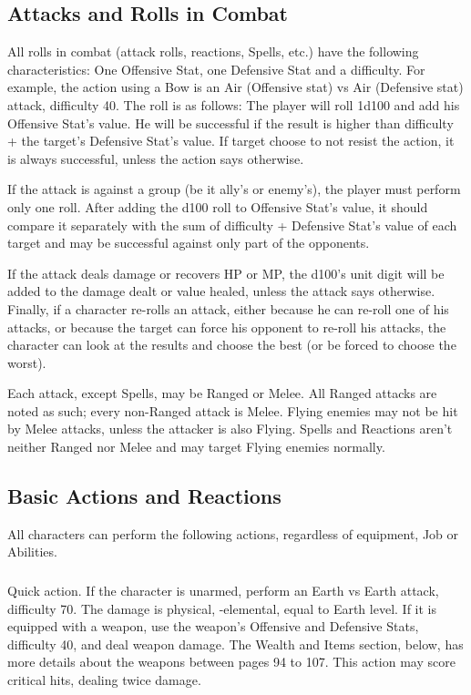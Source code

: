 \begin{multicols}{2}
\subsection{Attacks and Rolls in Combat}\label{subsec:attacks}
All rolls in combat (attack rolls, reactions, Spells, etc.) have the following characteristics: One Offensive Stat, one Defensive Stat and a difficulty. For example, the  action using a Bow is an Air (Offensive stat) vs Air (Defensive stat) attack, difficulty 40. The roll is as follows: The player will roll 1d100 and add his Offensive Stat’s value. He will be successful if the result is higher than difficulty + the target’s Defensive Stat’s value. If target choose to not resist the action, it is always successful, unless the action says otherwise.

If the attack is against a group (be it ally’s or enemy’s), the player must perform only one roll. After adding the d100 roll to Offensive Stat’s value, it should compare it separately with the sum of difficulty + Defensive Stat’s value of each target and may be successful against only part of the opponents.

If the attack deals damage or recovers HP or MP, the d100’s unit digit will be added to the damage dealt or value healed, unless the attack says otherwise. Finally, if a character re-rolls an attack, either because he can re-roll one of his attacks, or because the target can force his opponent to re-roll his attacks, the character can look at the results and choose the best (or be forced to choose the worst).

Each attack, except Spells, may be Ranged or Melee. All Ranged attacks are noted as such; every non-Ranged attack is Melee. Flying enemies may not be hit by Melee attacks, unless the attacker is also Flying. Spells and Reactions aren't neither Ranged nor Melee and may target Flying enemies normally.

\subsection{Basic Actions and Reactions}\label{subsec:basicactions}
All characters can perform the following actions, regardless of equipment, Job or Abilities.

\subsubsection{}
Quick action. If the character is unarmed, perform an Earth vs Earth attack, difficulty 70. The damage is physical, -elemental, equal to Earth level. If it is equipped with a weapon, use the weapon’s Offensive and Defensive Stats, difficulty 40, and deal weapon damage. The Wealth and Items section, below, has more details about the weapons between pages 94 to 107. This action may score critical hits, dealing twice damage.


\end{multicols}
